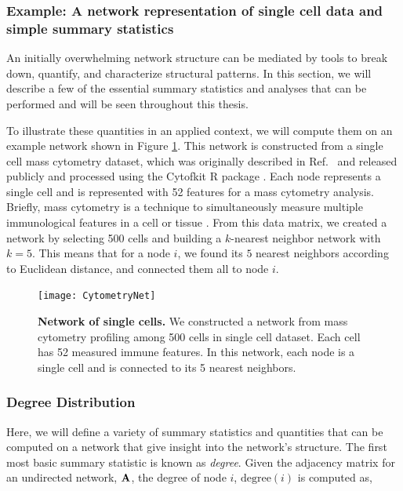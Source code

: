 \subsubsection{Example: A network representation of single cell data and simple summary statistics}

\indent An initially overwhelming network structure can be mediated by tools to break down, quantify, and characterize structural patterns. In this section, we will describe a few of the essential summary statistics and analyses that can be performed and will be seen throughout this thesis.

\indent To illustrate these quantities in an applied context, we will compute them on an example network shown in Figure \ref{fig:Cytometry}. This network is constructed from a single cell mass cytometry dataset, which was originally described in Ref.~\cite{wong2015} and released publicly and processed using the Cytofkit R package \cite{cytofkit}. Each node represents a single cell and is represented with 52 features for a mass cytometry analysis. Briefly, mass cytometry is a technique to simultaneously measure multiple immunological features in a cell or tissue \cite{cytof}. From this data matrix, we created a network by selecting 500 cells and building a $k$-nearest neighbor network with $k=5$. This means that for a node $i$, we found its $5$ nearest neighbors according to Euclidean distance, and connected them all to node $i$. 

\begin{figure}
\begin{center}
\texttt{[image: CytometryNet]}
\caption{{\bf Network of single cells.} We constructed a network from mass cytometry profiling among 500 cells in single cell dataset. Each cell has 52 measured immune features. In this network, each node is a single cell and is connected to its 5 nearest neighbors.}
\label{fig:Cytometry}
\end{center}
\end{figure}

\subsubsection{Degree Distribution}

Here, we will define a variety of summary statistics and quantities that can be computed on a network that give insight into the network's structure. The first most basic summary statistic is known as \emph{degree}.  Given the adjacency matrix for an undirected network, ${\bf A}$, the degree of node $i$, $\text{degree}(i)$ is computed as,

